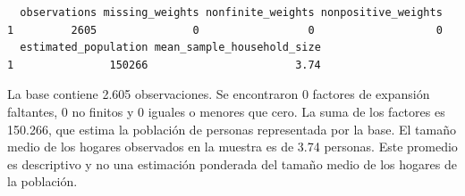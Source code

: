 \documentclass[
  spanish,
  11pt,
  letterpaper,
  oneside,
  open=any]{scrbook}
\newenvironment{Shaded}{\begin{snugshade}}{\end{snugshade}}
\newcommand{\AttributeTok}[1]{\textcolor[rgb]{0.40,0.45,0.13}{#1}}
\newcommand{\ConstantTok}[1]{\textcolor[rgb]{0.56,0.35,0.01}{#1}}
\newcommand{\DecValTok}[1]{\textcolor[rgb]{0.68,0.00,0.00}{#1}}
\newcommand{\FunctionTok}[1]{\textcolor[rgb]{0.28,0.35,0.67}{#1}}
\newcommand{\NormalTok}[1]{\textcolor[rgb]{0.00,0.23,0.31}{#1}}
\newcommand{\OtherTok}[1]{\textcolor[rgb]{0.00,0.23,0.31}{#1}}
\newcommand{\SpecialCharTok}[1]{\textcolor[rgb]{0.37,0.37,0.37}{#1}}
\newcommand{\StringTok}[1]{\textcolor[rgb]{0.13,0.47,0.30}{#1}}
\begin{document}
\begin{Shaded}
\end{Shaded}

\begin{verbatim}
  observations missing_weights nonfinite_weights nonpositive_weights
1         2605               0                 0                   0
  estimated_population mean_sample_household_size
1               150266                       3.74
\end{verbatim}

La base contiene 2.605 observaciones. Se encontraron 0 factores de
expansión faltantes, 0 no finitos y 0 iguales o menores que cero. La
suma de los factores es 150.266, que estima la población de personas
representada por la base. El tamaño medio de los hogares observados en
la muestra es de 3.74 personas. Este promedio es descriptivo y no una
estimación ponderada del tamaño medio de los hogares de la población.
\end{document}
